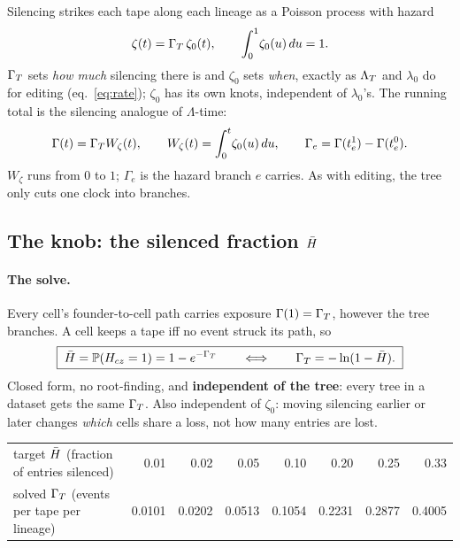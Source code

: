 Silencing strikes each tape along each lineage as a Poisson process with hazard
\begin{equation}
  \zeta(t)=\Gamma_T\,\zeta_0(t),\qquad \int_0^1\!\zeta_0(u)\,du=1 .
  \label{eq:zeta}
\end{equation}
$\Gamma_T$ sets \emph{how much} silencing there is and $\zeta_0$ sets \emph{when}, exactly as $\Lambda_T$ and
$\lambda_0$ do for editing (eq.~\ref{eq:rate}); $\zeta_0$ has its own knots, independent of
$\lambda_0$'s. The running total is the silencing analogue of $\Lambda$-time:
\begin{equation}
  \Gamma(t)=\Gamma_T W_\zeta(t),\qquad W_\zeta(t)=\int_0^t\!\zeta_0(u)\,du,\qquad
  \Gamma_e=\Gamma(t_e^1)-\Gamma(t_e^0).
  \label{eq:Gamma}
\end{equation}
$W_\zeta$ runs from $0$ to $1$; $\Gamma_e$ is the hazard branch $e$ carries. As with editing, the tree
only cuts one clock into branches.

\subsection{\texorpdfstring{The knob: the silenced fraction $\bar H$}{The knob: the silenced fraction}}\label{sec:Hbar}

\paragraph{The solve.} Every cell's founder-to-cell path carries exposure $\Gamma(1)=\Gamma_T$, however
the tree branches. A cell keeps a tape iff no event struck its path, so
\begin{equation}
  \boxed{\;\bar H=\mathbb{P}(H_{cz}=1)=1-e^{-\Gamma_T}\qquad\Longleftrightarrow\qquad\Gamma_T=-\ln(1-\bar H).\;}
  \label{eq:Hsolve}
\end{equation}
Closed form, no root-finding, and \textbf{independent of the tree}: every tree in a dataset gets the
same $\Gamma_T$. Also independent of $\zeta_0$: moving silencing earlier or later changes \emph{which}
cells share a loss, not how many entries are lost.

\begin{center}\small
\begin{tabular}{@{}lrrrrrrr@{}}
\toprule
target $\bar H$ (fraction of entries silenced) & 0.01 & 0.02 & 0.05 & 0.10 & 0.20 & 0.25 & 0.33 \\
solved $\Gamma_T$ (events per tape per lineage)  & 0.0101 & 0.0202 & 0.0513 & 0.1054 & 0.2231 & 0.2877 & 0.4005 \\
\bottomrule
\end{tabular}
\end{center}


